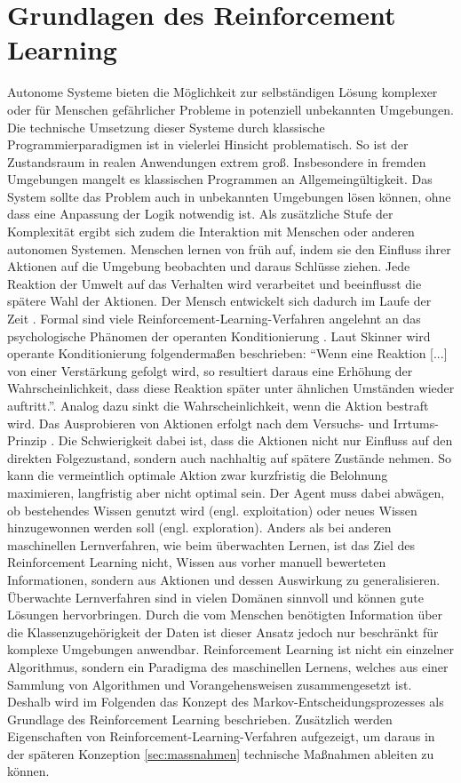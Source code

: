 \chapter{Grundlagen des Reinforcement Learning}\label{chap:grundlagen_rl}
Autonome Systeme bieten die Möglichkeit zur selbständigen Lösung komplexer oder für Menschen gefährlicher Probleme in potenziell unbekannten Umgebungen. 
Die technische Umsetzung dieser Systeme durch klassische Programmierparadigmen ist in vielerlei Hinsicht problematisch.
So ist der Zustandsraum in realen Anwendungen extrem groß. 
Insbesondere in fremden Umgebungen mangelt es klassischen Programmen an Allgemeingültigkeit. 
Das System sollte das Problem auch in unbekannten Umgebungen lösen können, ohne dass eine Anpassung der Logik notwendig ist.
Als zusätzliche Stufe der Komplexität ergibt sich zudem die Interaktion mit Menschen oder anderen autonomen Systemen. 
\ab
Menschen lernen von früh auf, indem sie den Einfluss ihrer Aktionen auf die Umgebung \cite[S. 1]{sutton2018} beobachten und daraus Schlüsse ziehen.
Jede Reaktion der Umwelt auf das Verhalten wird verarbeitet und beeinflusst die spätere Wahl der Aktionen.
Der Mensch entwickelt sich dadurch im Laufe der Zeit \cite[S. 634]{castano}.
Formal sind viele Reinforcement-Learning-Verfahren angelehnt an das psychologische Phänomen der operanten Konditionierung \cite[S. 34]{lefrancois1986}. 
Laut Skinner wird operante Konditionierung folgendermaßen beschrieben: 
\enquote{Wenn eine Reaktion [...] von einer Verstärkung gefolgt wird, so resultiert daraus eine Erhöhung der Wahrscheinlichkeit, dass diese Reaktion später unter ähnlichen Umständen wieder auftritt.}\cite[34]{lefrancois1986}.
Analog dazu sinkt die Wahrscheinlichkeit, wenn die Aktion bestraft wird.
Das Ausprobieren von Aktionen erfolgt nach dem Versuchs- und Irrtums-Prinzip \cite[S. 2f]{sutton2018}.
Die Schwierigkeit dabei ist, dass die Aktionen nicht nur Einfluss auf den direkten Folgezustand, sondern auch nachhaltig auf spätere Zustände nehmen.
So kann die vermeintlich optimale Aktion zwar kurzfristig die Belohnung maximieren, langfristig aber nicht optimal sein.
Der Agent muss dabei abwägen, ob bestehendes Wissen genutzt wird (engl. exploitation) oder neues Wissen hinzugewonnen werden soll (engl. exploration).
\ab
Anders als bei anderen maschinellen Lernverfahren, wie beim überwachten Lernen, ist das Ziel des Reinforcement Learning nicht, Wissen aus vorher manuell bewerteten Informationen, sondern aus Aktionen und dessen Auswirkung zu generalisieren.
Überwachte Lernverfahren sind in vielen Domänen sinnvoll und können gute Lösungen hervorbringen.
Durch die vom Menschen benötigten Information über die Klassenzugehörigkeit der Daten ist dieser Ansatz jedoch nur beschränkt für komplexe Umgebungen anwendbar.
\ab
Reinforcement Learning ist nicht ein einzelner Algorithmus, sondern ein Paradigma des maschinellen Lernens, welches aus einer Sammlung von Algorithmen und Vorangehensweisen zusammengesetzt ist.
Deshalb wird im Folgenden das Konzept des Markov-Entscheidungsprozesses als Grundlage des Reinforcement Learning beschrieben. 
Zusätzlich werden Eigenschaften von Reinforcement-Learning-Verfahren aufgezeigt, um daraus in der späteren Konzeption \autoref{sec:massnahmen} technische Maßnahmen ableiten zu können.


